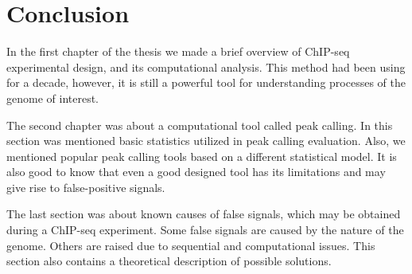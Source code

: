 \chapter*{Conclusion}

In the first chapter of the thesis we made a brief overview of ChIP-seq experimental design, and its computational analysis.
This method had been using for a decade, however, it is still a powerful tool for understanding processes of the genome of interest.


The second chapter was about a computational tool called peak calling.
In this section was mentioned basic statistics utilized in peak calling evaluation. 
Also, we mentioned popular peak calling tools based on a different statistical model.
It is also good to know that even a good designed tool has its limitations and may give rise to false-positive signals.

The last section was about known causes of false signals, which may be obtained during a ChIP-seq experiment.
Some false signals are caused by the nature of the genome. 
Others are raised due to sequential and computational issues.
This section also contains a theoretical description of possible solutions. 

